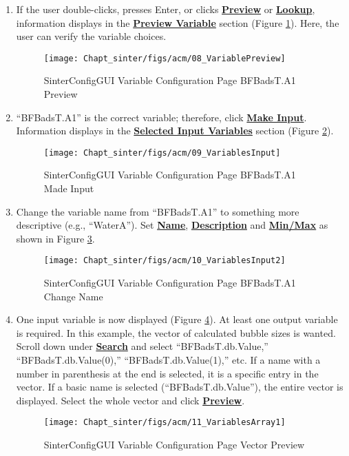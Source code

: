 \begin{enumerate}
\item If the user double-clicks, presses Enter, or clicks \textbf{\underline{Preview}} or \textbf{\underline{Lookup}},
  information displays in the \textbf{\underline{Preview Variable}} section (Figure \ref{fig.sinter.acm.variablepreview}).  Here, the user can verify the variable choices.
\begin{figure}[H]
	\begin{center}
		\texttt{[image: Chapt\_sinter/figs/acm/08\_VariablePreview]}
		\caption{SinterConfigGUI Variable Configuration Page BFBadsT.A1 Preview}
		\label{fig.sinter.acm.variablepreview}
	\end{center}
\end{figure}

\item ``BFBadsT.A1'' is the correct variable; therefore,  click \textbf{\underline{Make Input}}. Information displays in the \textbf{\underline{Selected Input Variables}} section (Figure \ref{fig.sinter.acm.variableinput}).
\begin{figure}[H]
	\begin{center}
		\texttt{[image: Chapt\_sinter/figs/acm/09\_VariablesInput]}
		\caption{SinterConfigGUI Variable Configuration Page BFBadsT.A1 Made Input}
		\label{fig.sinter.acm.variableinput}
	\end{center}
\end{figure}

\item Change the variable name from ``BFBadsT.A1'' to something more descriptive (e.g., ``WaterA''). Set  \textbf{\underline{Name}}, \textbf{\underline{Description}} and \textbf{\underline{Min/Max}} as shown in Figure \ref{fig.sinter.acm.variablename}.
\begin{figure}[H]
	\begin{center}
		\texttt{[image: Chapt\_sinter/figs/acm/10\_VariablesInput2]}
		\caption{SinterConfigGUI Variable Configuration Page BFBadsT.A1 Change Name}
		\label{fig.sinter.acm.variablename}
	\end{center}
\end{figure}

\item One input variable is now displayed (Figure \ref{fig.sinter.acm.vectorpreview}). At least one
  output variable is required. In this example, the vector of calculated bubble
  sizes is wanted. Scroll down under \textbf{\underline{Search}} and select ``BFBadsT.db.Value,'' ``BFBadsT.db.Value(0),''
  ``BFBadsT.db.Value(1),'' etc.  If a name with a number in
  parenthesis at the end is selected, it is a specific entry in the vector. If a
  basic name is selected (``BFBadsT.db.Value''), the entire vector is displayed. Select the whole vector and click \textbf{\underline{Preview}}.
\begin{figure}[H]
	\begin{center}
		\texttt{[image: Chapt\_sinter/figs/acm/11\_VariablesArray1]}
		\caption{SinterConfigGUI Variable Configuration Page Vector Preview}
		\label{fig.sinter.acm.vectorpreview}
	\end{center}
\end{figure}


\end{enumerate}
